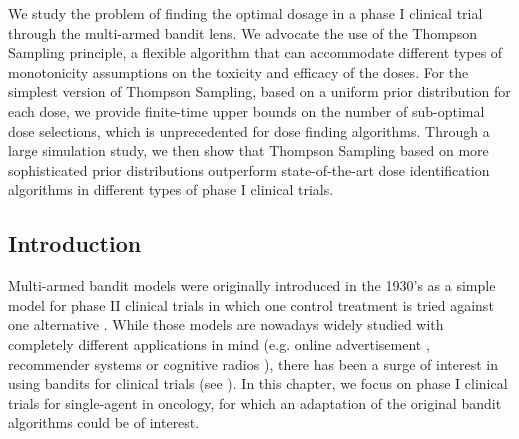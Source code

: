 %
%
%
%
We study the problem of finding the optimal dosage in a phase I clinical trial through the multi-armed bandit lens. We advocate the use of the Thompson Sampling principle, a flexible algorithm that can accommodate different types of monotonicity assumptions on the toxicity and efficacy of the doses. For the simplest version of Thompson Sampling, based on a uniform prior distribution for each dose, we provide finite-time upper bounds on the number of sub-optimal dose selections, which is unprecedented for dose finding algorithms. Through a large simulation study, we then show that Thompson Sampling based on more sophisticated prior distributions outperform state-of-the-art dose identification algorithms in different types of phase I clinical trials.  %


%

\subsection{Introduction}

Multi-armed bandit models were originally introduced in the 1930's as a simple model for phase II clinical trials in which one control treatment is tried against one alternative \cite{Thompson33}. While those models are nowadays widely studied with completely different applications in mind (e.g. online advertisement \cite{LiChapelle11}, recommender systems \cite{LiCLS10News} or cognitive radios \cite{Anandkumar11}), there has been a surge of interest in using bandits for clinical trials (see \cite{Villar15BCT}). In this chapter, we focus on phase I clinical trials for single-agent in oncology, for which an adaptation of the original bandit algorithms could be of interest.  

